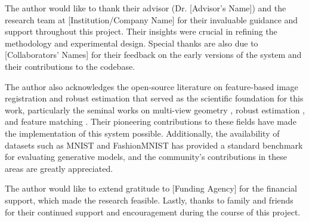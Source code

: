 
The author would like to thank their advisor (Dr. [Advisor's Name]) and the research team at [Institution/Company Name] for their invaluable guidance and support throughout this project. Their insights were crucial in refining the methodology and experimental design. Special thanks are also due to [Collaborators' Names] for their feedback on the early versions of the system and their contributions to the codebase.

The author also acknowledges the open-source literature on feature-based image registration and robust estimation that served as the scientific foundation for this work, particularly the seminal works on multi-view geometry \citep{HartleyZisserman2004}, robust estimation \citep{FischlerBolles1981}, and feature matching \citep{Rublee2011ORB}. Their pioneering contributions to these fields have made the implementation of this system possible. Additionally, the availability of datasets such as MNIST and FashionMNIST has provided a standard benchmark for evaluating generative models, and the community's contributions in these areas are greatly appreciated.

The author would like to extend gratitude to [Funding Agency] for the financial support, which made the research feasible. Lastly, thanks to family and friends for their continued support and encouragement during the course of this project.

